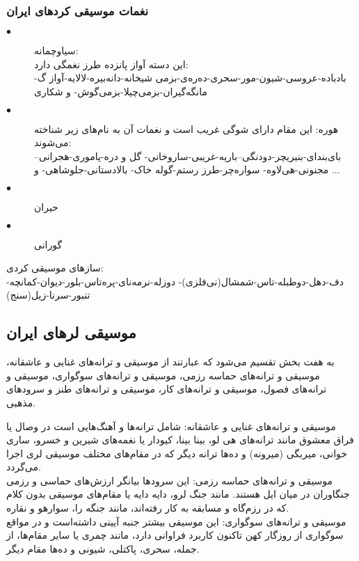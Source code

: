 \subsubsection{نغمات موسیقی کردهای ایران}
\begin{description}
    \item[$\bullet$] سیاوچمانه:\\
	این دسته آواز پانزده طرز نغمگی دارد:\\
	بادباده-عروسی-شیون-مور-سحری-ده‌ره‌ی-بزمی شیخانه-دانه‌بیره-لالایه-آواز گ-مانگه‌گیران-بزمی‌چیلا-بزمی‌گوش- و شکاری
    \item[$\bullet$] هوره:
	این مقام دارای شوگی غریب است و نغمات آن به نام‌های زیر شناخته می‌شوند:\\
	بای‌بندای-بنیریچر-دودنگی--باریه-غریبی-ساروخانی- گل و دره-پاموری-هجرانی--مجنونی-هی‌لاوه- سواره‌چر-طرز رستم-گوله خاک- بالادستانی-جلوشاهی- و ...
    \item[$\bullet$] حیران
    \item[$\bullet$] گورانی
\end{description}



سازهای موسیقی کردی:\\
دف-دهل-دوطبله-تاس-شمشال(نی‌فلزی)- دوزله-نرمه‌نای-پره‌تاس-بلور-دیوان-کمانچه-تنبور-سرنا-زیل(سنج)
\subsection{موسیقی لرهای ایران}
 به هفت بخش تقسیم می‌شود که عبارتند از موسیقی و ترانه‌های غنایی و عاشقانه، موسیقی و ترانه‌های حماسه رزمی، موسیقی و ترانه‌های سوگواری، موسیقی و ترانه‌های فصول، موسیقی و ترانه‌های کار، موسیقی و ترانه‌های طنز و سرودهای مذهبی.

موسیقی و ترانه‌های غنایی و عاشقانه: شامل ترانه‌ها و آهنگ‌هایی است در وصال یا فراق معشوق مانند ترانه‌های هی لو، بینا بینا، کیودار یا نغمه‌های شیرین و خسرو، ساری خوانی، میربگی (میرونه) و ده‌ها ترانه دیگر که در مقام‌های مختلف موسیقی لری اجرا می‌گردد.\\

موسیقی و ترانه‌های حماسه رزمی: این سرودها بیانگر ارزش‌های حماسی و رزمی جنگاوران در میان ایل هستند. مانند جنگ لرو، دایه دایه یا مقام‌های موسیقی بدون کلام که در رزم‌گاه و مسابقه به کار رفته‌اند، مانند جنگه را، سوارهو و نقاره.\\

موسیقی و ترانه‌های سوگواری: این موسیقی بیشتر جنبه آیینی داشته‌است و در مواقع سوگواری از روزگار کهن تاکنون کاربرد فراوانی دارد، مانند چمری یا سایر مقام‌ها، از جمله، سحری، پاکتلی، شیونی و ده‌ها مقام دیگر.\\

